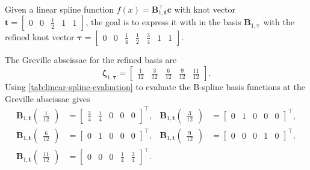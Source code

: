 \begin{example}
    Given a linear spline function $f(x) = \mathbf B_{1, \mathbf t}^\top \mathbf c$ with knot vector $\mathbf t = \begin{bmatrix} 0 & 0 & \frac{1}{2} & 1 & 1\end{bmatrix}$, the goal is to express it with in the basis $\mathbf B_{1, \boldsymbol \tau}$ with the refined knot vector $\boldsymbol \tau = \begin{bmatrix} 0 & 0 & \frac{1}{4} & \frac{1}{2} & \frac{3}{4} & 1 & 1\end{bmatrix}$.

    The Greville abscissae for the refined basis are
    \begin{equation*}
        \boldsymbol \zeta_{1,\boldsymbol \tau} = 
        \begin{bmatrix}
            \frac{1}{12} & \frac{3}{12} & \frac{6}{12} & \frac{9}{12} & \frac{11}{12}
        \end{bmatrix}.
    \end{equation*}
    Using \cref{tab:linear-spline-evaluation} to evaluate the B-spline basis functions at the Greville abscissae gives
    \begin{equation*}
        \begin{aligned}
            \mathbf B_{1, \mathbf t}\begin{pmatrix}\frac{1}{12}\end{pmatrix} &= \begin{bmatrix} \frac{3}{4} & \frac{1}{4} & 0 & 0 & 0 \end{bmatrix}^\top,
            &\mathbf B_{1, \mathbf t}\begin{pmatrix}\frac{3}{12}\end{pmatrix} &= \begin{bmatrix} 0 & 1 & 0 & 0 & 0 \end{bmatrix}^\top, \\
            \mathbf B_{1, \mathbf t}\begin{pmatrix}\frac{6}{12}\end{pmatrix} &= \begin{bmatrix} 0 & 1 & 0 & 0 & 0 \end{bmatrix}^\top,
            &\mathbf B_{1, \mathbf t}\begin{pmatrix}\frac{9}{12}\end{pmatrix} &= \begin{bmatrix} 0 & 0 & 0 & 1 & 0 \end{bmatrix}^\top, \\
            \mathbf B_{1, \mathbf t}\begin{pmatrix}\frac{11}{12}\end{pmatrix} &= \begin{bmatrix} 0 & 0 & 0 & \frac{1}{4} & \frac{3}{4} \end{bmatrix}^\top.
        \end{aligned}
    \end{equation*}


\end{example}
